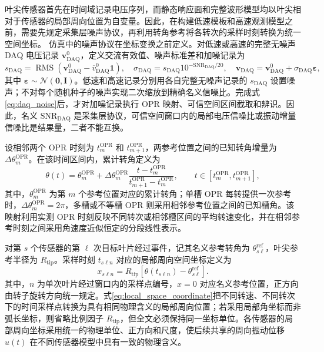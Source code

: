 \documentclass[UTF8,12pt,a4paper]{ctexart}
\begin{document}
叶尖传感器首先在时间域记录电压序列，而静态响应面和完整波形模型均以叶尖相对于传感器的局部周向位置为自变量。因此，在构建低速模板和高速观测模型之前，需要先规定采集层噪声协议，再利用转角参考将各转次的采样时刻转换为统一空间坐标。
仿真中的噪声协议在坐标变换之前定义。对低速或高速的完整无噪声 DAQ 电压记录 $\bm v_{\mathrm{DAQ}}^0$，定义交流有效值、噪声标准差和加噪记录为
\begin{equation}
s_{\mathrm{DAQ}}
=\operatorname{RMS}\!\left(\bm v_{\mathrm{DAQ}}^0-\overline v_{\mathrm{DAQ}}^0\bm 1\right),
\quad
\sigma_{\mathrm{DAQ}}=s_{\mathrm{DAQ}}10^{-\mathrm{SNR}_{\mathrm{DAQ}}/20},
\quad
\bm v_{\mathrm{DAQ}}=\bm v_{\mathrm{DAQ}}^0+\sigma_{\mathrm{DAQ}}\bm\varepsilon,
\label{eq:daq_noise}
\end{equation}
其中 $\bm\varepsilon\sim\mathcal N(\bm0,\bm I)$。低速和高速记录分别用各自完整无噪声记录的 $s_{\mathrm{DAQ}}$ 设置噪声；不对每个随机种子的噪声实现二次缩放到精确名义信噪比。完成式\eqref{eq:daq_noise}后，才对加噪记录执行 OPR 映射、可信空间区间截取和辨识。因此，名义 $\mathrm{SNR}_{\mathrm{DAQ}}$ 是采集层协议，可信空间窗口内的局部电压信噪比或振动增量信噪比是结果量，二者不能互换。

设相邻两个 OPR 时刻为 $t_m^{\mathrm{OPR}}$ 和 $t_{m+1}^{\mathrm{OPR}}$，两参考位置之间的已知转角增量为 $\Delta\theta_m^{\mathrm{OPR}}$。在该时间区间内，累计转角定义为
\begin{equation}
\theta(t)=\theta_m^{\mathrm{OPR}}
+\Delta\theta_m^{\mathrm{OPR}}
\frac{t-t_m^{\mathrm{OPR}}}
{t_{m+1}^{\mathrm{OPR}}-t_m^{\mathrm{OPR}}},
\qquad
t\in[t_m^{\mathrm{OPR}},t_{m+1}^{\mathrm{OPR}}],
\label{eq:time_to_angle}
\end{equation}
其中，$\theta_m^{\mathrm{OPR}}$ 为第 $m$ 个参考位置对应的累计转角；单槽 OPR 每转提供一次参考时，$\Delta\theta_m^{\mathrm{OPR}}=2\pi$，多槽或不等槽 OPR 则采用相邻参考位置之间的已知槽角。该映射利用实测 OPR 时刻反映不同转次或相邻槽区间的平均转速变化，并在相邻参考时刻之间采用角速度近似恒定的分段线性表示。

对第 $s$ 个传感器的第 $\ell$ 次目标叶片经过事件，记其名义参考转角为 $\theta_{s\ell}^{\mathrm{ref}}$，叶尖参考半径为 $R_{\mathrm{tip}}$。采样时刻 $t_{s\ell n}$ 对应的局部周向空间坐标定义为
\begin{equation}
x_{s\ell n}
=R_{\mathrm{tip}}
\left[\theta(t_{s\ell n})-\theta_{s\ell}^{\mathrm{ref}}\right].
\label{eq:local_space_coordinate}
\end{equation}
其中，$n$ 为单次叶片经过窗口内的采样点编号，$x=0$ 对应名义参考位置，正方向由转子旋转方向统一规定。式\eqref{eq:local_space_coordinate}把不同转速、不同转次下的时间采样点转换为具有相同物理含义的局部周向位置；若采用局部角坐标而非弧长坐标，则省略比例因子 $R_{\mathrm{tip}}$，但全文必须保持同一坐标单位。各传感器的局部周向坐标采用统一的物理单位、正方向和尺度，使后续共享的周向振动位移 $u(t)$ 在不同传感器模型中具有一致的物理含义。
\end{document}

